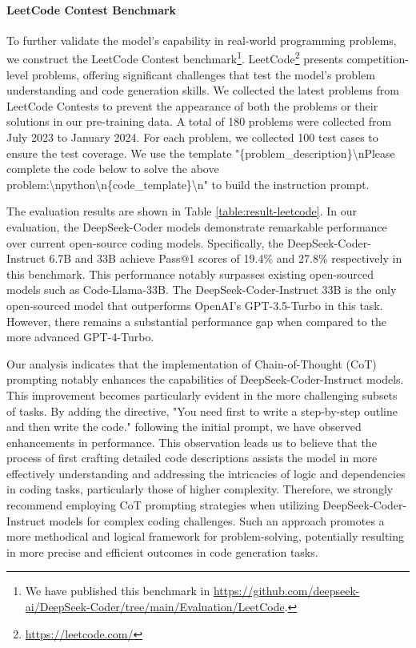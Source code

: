 \paragraph{LeetCode Contest Benchmark} To further validate the model's capability in real-world programming problems, we construct the LeetCode Contest benchmark\footnote{We have published this benchmark in \url{https://github.com/deepseek-ai/DeepSeek-Coder/tree/main/Evaluation/LeetCode}.}. LeetCode\footnote{\url{https://leetcode.com/}} presents competition-level problems, offering significant challenges that test the model's problem understanding and code generation skills. We collected the latest problems from LeetCode Contests to prevent the appearance of both the problems or their solutions in our pre-training data. A total of 180 problems were collected from July 2023 to January 2024. For each problem, we collected 100 test cases to ensure the test coverage. We use the template "\{problem\_description\}\textbackslash nPlease complete the code below to solve the above problem:\textbackslash n\textasciigrave\textasciigrave\textasciigrave python\textbackslash n\{code\_template\}\textbackslash n\textasciigrave\textasciigrave\textasciigrave" to build the instruction prompt.

The evaluation results are shown in Table \ref{table:result-leetcode}.
In our evaluation, the DeepSeek-Coder models demonstrate remarkable performance over current open-source coding models. Specifically, the DeepSeek-Coder-Instruct 6.7B and 33B achieve Pass@1 scores of 19.4\% and 27.8\% respectively in this benchmark. This performance notably surpasses existing open-sourced models such as Code-Llama-33B. The DeepSeek-Coder-Instruct 33B is the only open-sourced model that outperforms OpenAI's GPT-3.5-Turbo in this task. However, there remains a substantial performance gap when compared to the more advanced GPT-4-Turbo. 

Our analysis indicates that the implementation of Chain-of-Thought (CoT) prompting notably enhances the capabilities of DeepSeek-Coder-Instruct models. This improvement becomes particularly evident in the more challenging subsets of tasks. By adding the directive, "You need first to write a step-by-step outline and then write the code." following the initial prompt, we have observed enhancements in performance. This observation leads us to believe that the process of first crafting detailed code descriptions assists the model in more effectively understanding and addressing the intricacies of logic and dependencies in coding tasks, particularly those of higher complexity. Therefore, we strongly recommend employing CoT prompting strategies when utilizing DeepSeek-Coder-Instruct models for complex coding challenges. Such an approach promotes a more methodical and logical framework for problem-solving, potentially resulting in more precise and efficient outcomes in code generation tasks.

